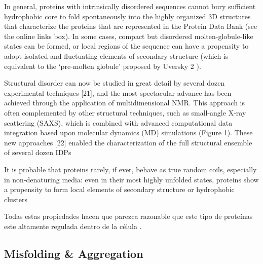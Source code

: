In general, proteins with intrinsically disordered sequences cannot bury sufficient hydrophobic core to fold spontaneously into the highly organized 3D structures that characterize the proteins that are represented in the Protein Data Bank (see the online links
box). In some cases, compact but disordered molten-globule-like states can be formed, or local regions of the sequence can have a propensity to adopt isolated and fluctuating elements of secondary structure (which is equivalent to the ‘pre-molten globule’ proposed by Uversky 2 ). 

Structural disorder can now be studied in great detail by several dozen experimental techniques [21], and the most spectacular advance has been achieved through the application of multidimensional NMR. This approach is often
complemented by other structural techniques, such as small-angle X-ray scattering (SAXS), which is combined with advanced computational data integration based upon molecular dynamics (MD) simulations (Figure 1). These new
approaches [22] enabled the characterization of the full structural ensemble of several dozen IDPs

It is probable that proteins rarely, if ever, behave as true random coils, especially in non-denaturing media: even in their most highly unfolded states, proteins show a propensity to form local elements of secondary structure or hydrophobic clusters







Todas estas propiedades hacen que parezca razonable que este tipo de proteínas este altamente regulada dentro de la célula \cite{gsponer2008tight}.

















\subsection{Misfolding \& Aggregation}


